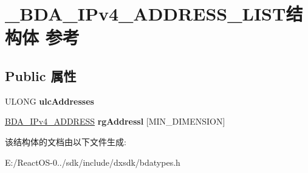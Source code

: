 \hypertarget{struct___b_d_a___i_pv4___a_d_d_r_e_s_s___l_i_s_t}{}\section{\+\_\+\+B\+D\+A\+\_\+\+I\+Pv4\+\_\+\+A\+D\+D\+R\+E\+S\+S\+\_\+\+L\+I\+S\+T结构体 参考}
\label{struct___b_d_a___i_pv4___a_d_d_r_e_s_s___l_i_s_t}
\subsection*{Public 属性}
\begin{DoxyCompactItemize}
\item 
\mbox{\label{struct___b_d_a___i_pv4___a_d_d_r_e_s_s___l_i_s_t_ac558529b75d490670edd30c4c95e63fb}} 
U\+L\+O\+NG {\bfseries ulc\+Addresses}
\item 
\mbox{\label{struct___b_d_a___i_pv4___a_d_d_r_e_s_s___l_i_s_t_a4043ada05068ed25fdab20720917ae5f}} 
\hyperlink{struct___b_d_a___i_pv4___a_d_d_r_e_s_s}{B\+D\+A\+\_\+\+I\+Pv4\+\_\+\+A\+D\+D\+R\+E\+SS} {\bfseries rg\+Addressl} \mbox{[}M\+I\+N\+\_\+\+D\+I\+M\+E\+N\+S\+I\+ON\mbox{]}
\end{DoxyCompactItemize}


该结构体的文档由以下文件生成\+:\begin{DoxyCompactItemize}
\item 
E\+:/\+React\+O\+S-\/0../sdk/include/dxsdk/bdatypes.\+h\end{DoxyCompactItemize}
